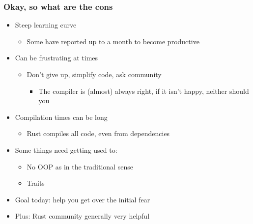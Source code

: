 \documentclass[aspectratio=169]{beamer}
\begin{document}
\begin{frame}
  \frametitle{Okay, so what are the cons}

  \begin{itemize}
  \item Steep learning curve
    \begin{itemize}
    \item Some have reported up to a month to become productive
    \end{itemize}
    \pause
  \item Can be frustrating at times
    \begin{itemize}
    \item Don't give up, simplify code, ask community
      \begin{itemize}
      \item The compiler is (almost) always right, if it isn't happy, neither should you
      \end{itemize}
    \end{itemize}
    \pause
  \item Compilation times can be long
    \begin{itemize}
    \item Rust compiles all code, even from dependencies
    \end{itemize}
    \pause
  \item Some things need getting used to:
    \begin{itemize}
    \item No OOP as in the traditional sense
    \item Traits
    \end{itemize}
  \end{itemize}


  \pause
  \begin{itemize}
  \item Goal today: help you get over the initial fear
  \item Plus: Rust community generally very helpful
  \end{itemize}

\end{frame}
\end{document}
